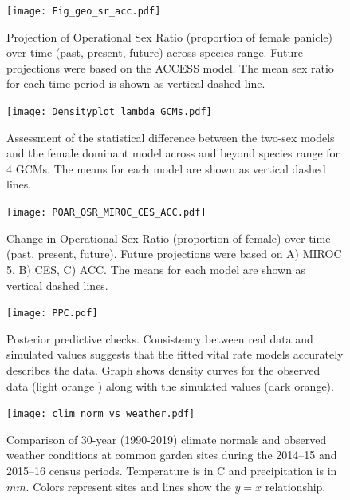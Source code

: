 \documentclass[9pt,twoside,lineno]{pnas-new}
\begin{document}
\begin{figure}[H]
	\begin{center}
		\texttt{[image: Fig\_geo\_sr\_acc.pdf]}
		\caption{Projection  of Operational Sex Ratio (proportion of female panicle) over time (past, present, future) across species range.
			Future projections were based on the ACCESS  model.
			The mean sex ratio for each time period is shown as vertical dashed line.}
		\label{Sup:geoosrprojacc}
	\end{center}
\end{figure}
\clearpage


\begin{figure}
\centering
\texttt{[image: Densityplot\_lambda\_GCMs.pdf]}
\caption{ Assessment of the statistical difference between the two-sex models and the female dominant model across and beyond species range for 4 GCMs. 
			The means for each model are shown as vertical dashed lines. }
\label{Sup:geo_overestimation}
\end{figure}
\clearpage
%
\begin{figure}
\centering
\texttt{[image: POAR\_OSR\_MIROC\_CES\_ACC.pdf]}
\caption{Change in Operational Sex Ratio (proportion of female) over time (past, present, future).
			Future projections were based on A) MIROC 5, B) CES, C) ACC.
			The means for each model are shown as vertical dashed lines.}
\label{Sup:osrall}
\end{figure}
\clearpage

\begin{figure}
\centering
\texttt{[image: PPC.pdf]}
\caption{Posterior predictive checks. Consistency between real data and simulated values suggests that the fitted vital rate models accurately describes the data. Graph shows density curves for the observed data (light orange ) along with the simulated values (dark orange).}
\label{Sup:PPC}
\end{figure}
\clearpage

\begin{figure}
\centering
\texttt{[image: clim\_norm\_vs\_weather.pdf]}
\caption{Comparison of 30-year (1990-2019) climate normals and observed weather conditions at common garden sites during the 2014--15 and 2015--16 census periods. Temperature is in \degree C and precipitation is in $mm$. Colors represent sites and lines show the $y=x$ relationship.}
\label{Sup:climate_normal_weather}
\end{figure}
\clearpage








\newpage


\end{document}
